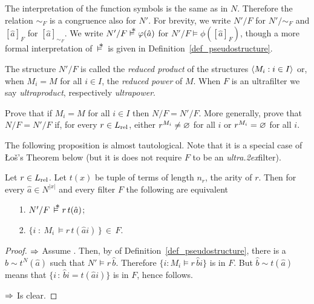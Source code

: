 \documentclass[creche.tex]{subfiles}
\begin{document}

The interpretation of the function symbols is the same as in $N$.
Therefore the relation $\sim_F$ is a congruence also for $N'$.
For brevity, we write $N'/F$ for $N'/{\sim}_F$ and $[\hat a]_F$ for $[\hat a]_{\sim_F}$.
We write $N'/F\pmodels\phi(\hat a)$ for $N'/F\models\phi([\hat a]_F)$, though a more formal interpretation of $\,\pmodels\,$ is given in Definition~\ref{def_pseudostructure}.


The structure $N'/F$ is called the \emph{reduced product\/} of the structures $\langle M_i:i\in I\rangle$ or, when $M_i=M$ for all $i\in I$, the \emph{reduced power\/} of $M$. When $F$ is an ultrafilter we say \emph{ultraproduct}, respectively \emph{ultrapower}.

\begin{exercise}
  Prove that if $M_i=M$ for all $i\in I$ then $N/F=N'/F$. More generally, prove that $N/F=N'/F$ if, for every $r\in L_{\rm rel}$, either $r^{M_i}\neq\varnothing$ for all $i$ or $r^{M_i}=\varnothing$ for all $i$.\QED
\end{exercise}

The following proposition is almost tautological.
Note that it is a special case of \L o\v{s}'s Theorem below (but it is does not require $F$ to be an \textit{ultra\kern.2ex}filter).

\begin{proposition}\label{prop_eq_ultra}
  Let $r\in L_{\rm rel}$.
  Let $t(x)$ be tuple of terms of length $n_r$, the arity of $r$.
  Then for every $\hat a\in N^{|x|}$ and every filter $F$ the following are equivalent
  \begin{itemize}
  \item[1.] $N'/F\,\pmodels r\,t(\hat a)$;

  \item[2.] $\big\{i\; :\ M_i\,\models r\,t(\hat ai)\,\big\}\,\in\, F$.
  \end{itemize}
\end{proposition}

\begin{proof}
  $\Rightarrow$ 
  Assume .
  Then, by  of Definition~\ref{def_pseudostructure}, there is a $\hat b\sim t^N(\hat a)$ such that $N'\models r\,\hat b$.
  Therefore $\{i:M_i\models r\,\hat bi\}$ is in $F$.
  But $\hat b\sim t(\hat a)$ means that $\big\{i\, :\, \hat bi= t(\hat ai)\big\}$ is in $F$, hence  follows.

  $\Rightarrow$ Is clear.
\end{proof}
\end{document}
